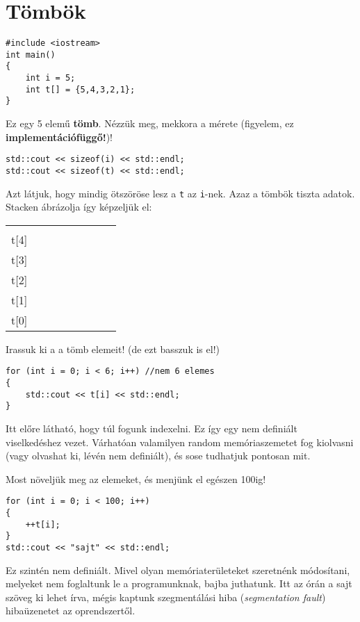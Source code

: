 \documentclass[a4paper,11.5pt]{article}
\begin{document}
	\section{Tömbök}
		
		\begin{lstlisting}
#include <iostream>
int main()
{
	int i = 5;
	int t[] = {5,4,3,2,1};
}
		\end{lstlisting}
		Ez egy 5 elemű \textbf{tömb}. Nézzük meg, mekkora a mérete (figyelem, ez \textbf{implementációfüggő!})!
		\begin{lstlisting}
std::cout << sizeof(i) << std::endl;
std::cout << sizeof(t) << std::endl;
		\end{lstlisting}
		Azt látjuk, hogy mindig ötszöröse lesz a \texttt{t} az \texttt{i}-nek. Azaz a tömbök tiszta adatok.  Stacken ábrázolja így képzeljük el:
		\begin{center}
			\begin{tabular}{r|c|l}
				&&\\
				\cline{2-2}
				t[4]&&\\
				\cline{2-2}
				t[3]&~~~~~~~~~~~&\\
				\cline{2-2}
				t[2]&&\\
				\cline{2-2}
				t[1]&&\\
				\cline{2-2}
				t[0]&&\\
				\cline{2-2}
			\end{tabular}
		\end{center}
		Irassuk ki a a tömb elemeit! (de ezt basszuk is el!)
		\begin{lstlisting}
for (int i = 0; i < 6; i++) //nem 6 elemes
{
	std::cout << t[i] << std::endl;
}
		\end{lstlisting} 
		Itt előre látható, hogy túl fogunk indexelni. Ez így egy {nem definiált viselkedés}hez vezet. Várhatóan valamilyen random memóriaszemetet fog kiolvasni (vagy olvashat ki, lévén nem definiált), és sose tudhatjuk pontosan mit.
		
		Most növeljük meg az elemeket, és menjünk el egészen 100ig!
		\begin{lstlisting}
for (int i = 0; i < 100; i++)
{
	++t[i];
}
std::cout << "sajt" << std::endl;
		\end{lstlisting} 
		Ez szintén nem definiált. Mivel olyan memóriaterületeket szeretnénk módosítani, melyeket nem foglaltunk le a programunknak, bajba juthatunk. Itt az órán a {sajt} szöveg ki lehet írva, mégis kaptunk szegmentálási hiba (\textit{segmentation fault}) hibaüzenetet az oprendszertől.
		
\end{document}
